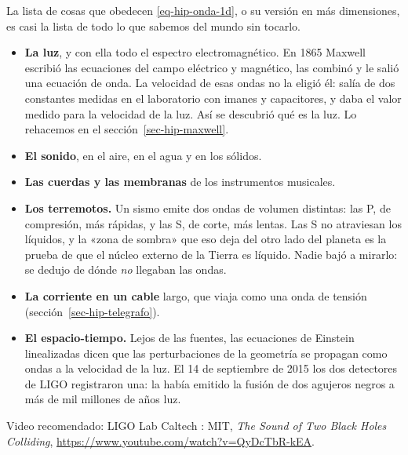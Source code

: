 \documentclass[
  spanish,
  a4paper,
]{scrbook}
\providecommand{\tightlist}{%
  \setlength{\itemsep}{0pt}\setlength{\parskip}{0pt}}
\theoremstyle{definition}
\theoremstyle{plain}
\theoremstyle{definition}
\theoremstyle{plain}
\theoremstyle{definition}
\theoremstyle{remark}
\begin{document}
La lista de cosas que obedecen \ref{eq-hip-onda-1d}, o su versión en más
dimensiones, es casi la lista de todo lo que sabemos del mundo sin
tocarlo.

\begin{itemize}
\tightlist
\item
  \textbf{La luz}, y con ella todo el espectro electromagnético. En 1865
  Maxwell escribió las ecuaciones del campo eléctrico y magnético, las
  combinó y le salió una ecuación de onda. La velocidad de esas ondas no
  la eligió él: salía de dos constantes medidas en el laboratorio con
  imanes y capacitores, y daba el valor medido para la velocidad de la
  luz. Así se descubrió qué es la luz. Lo rehacemos en el
  sección~\ref{sec-hip-maxwell}.
\item
  \textbf{El sonido}, en el aire, en el agua y en los sólidos.
\item
  \textbf{Las cuerdas y las membranas} de los instrumentos musicales.
\item
  \textbf{Los terremotos.} Un sismo emite dos ondas de volumen
  distintas: las P, de compresión, más rápidas, y las S, de corte, más
  lentas. Las S no atraviesan los líquidos, y la «zona de sombra» que
  eso deja del otro lado del planeta es la prueba de que el núcleo
  externo de la Tierra es líquido. Nadie bajó a mirarlo: se dedujo de
  dónde \emph{no} llegaban las ondas.
\item
  \textbf{La corriente en un cable} largo, que viaja como una onda de
  tensión (sección~\ref{sec-hip-telegrafo}).
\item
  \textbf{El espacio-tiempo.} Lejos de las fuentes, las ecuaciones de
  Einstein linealizadas dicen que las perturbaciones de la geometría se
  propagan como ondas a la velocidad de la luz. El 14 de septiembre de
  2015 los dos detectores de LIGO registraron una: la había emitido la
  fusión de dos agujeros negros a más de mil millones de años luz.
\end{itemize}

Video recomendado: LIGO Lab Caltech : MIT, \emph{The Sound of Two Black
Holes Colliding}, \url{https://www.youtube.com/watch?v=QyDcTbR-kEA}.
\end{document}

